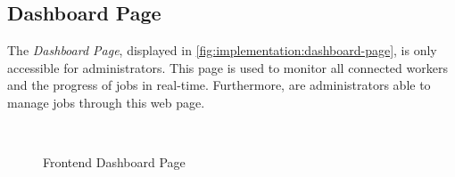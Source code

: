 \subsection{Dashboard Page}
\label{subsec:implementation:dashboard-page}
The \emph{Dashboard Page}, displayed in \autoref{fig:implementation:dashboard-page}, is only accessible for administrators. This page is used to monitor all connected workers and the progress of jobs in real-time. Furthermore, are administrators able to manage jobs through this web page.
\begin{figure}[htbp]
    \myfloatalign
     \\
    \caption{Frontend Dashboard Page}
    \label{fig:implementation:dashboard-page}
\end{figure}

